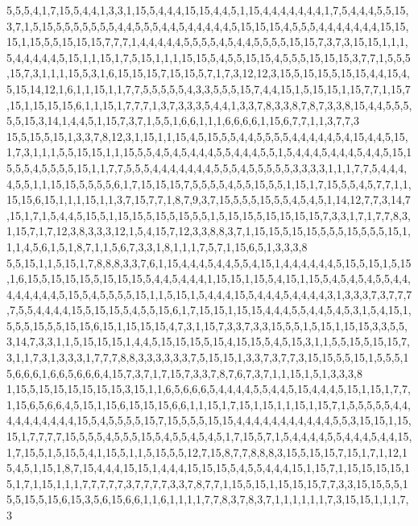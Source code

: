 5,5,5,4,1,7,15,5,4,4,1,3,3,1,15,5,4,4,4,15,15,4,4,5,1,15,4,4,4,4,4,4,4,1,7,5,4,4,4,5,5,15,3,7,1,5,15,5,5,5,5,5,5,5,4,4,5,5,5,4,4,5,4,4,4,4,4,5,15,15,15,4,5,5,5,4,4,4,4,4,4,4,15,15,15,1,15,5,5,15,15,15,7,7,7,1,4,4,4,4,4,5,5,5,5,4,5,4,4,5,5,5,5,15,15,7,3,7,3,15,15,1,1,1,5,4,4,4,4,4,5,15,1,1,15,1,7,5,15,1,1,1,15,15,5,4,5,5,15,15,4,5,5,5,15,15,15,3,7,7,1,5,5,5,15,7,3,1,1,1,15,5,3,1,6,15,15,15,7,15,15,5,7,1,7,3,12,12,3,15,5,15,15,5,15,15,4,4,15,4,5,15,14,12,1,6,1,1,15,1,1,7,7,5,5,5,5,5,4,3,3,5,5,5,15,7,4,4,15,1,5,15,15,1,15,7,7,1,15,7,15,1,15,15,15,6,1,1,15,1,7,7,7,1,3,7,3,3,3,5,4,4,1,3,3,7,8,3,3,8,7,8,7,3,3,8,15,4,4,5,5,5,5,5,15,3,14,1,4,4,5,1,15,7,3,7,1,5,5,1,6,6,1,1,1,6,6,6,6,1,15,6,7,7,1,1,3,7,7,3
15,5,15,5,15,1,3,3,7,8,12,3,1,15,1,1,15,4,5,15,5,5,4,4,5,5,5,5,4,4,4,4,4,5,4,15,4,4,5,15,1,7,3,1,1,1,5,5,15,15,1,1,15,5,5,4,5,4,5,4,4,4,5,5,4,4,4,5,5,1,5,4,4,4,5,4,4,4,5,4,4,5,15,15,5,5,4,5,5,5,5,15,1,1,7,7,5,5,5,4,4,4,4,4,4,4,5,5,5,4,5,5,5,5,5,3,3,3,3,1,1,1,7,7,5,4,4,4,4,5,5,1,1,15,15,5,5,5,5,6,1,7,15,15,15,7,5,5,5,5,4,5,5,15,5,5,1,15,1,7,15,5,5,4,5,7,7,1,1,15,15,6,15,1,1,1,15,1,1,3,7,15,7,7,1,8,7,9,3,7,15,5,5,5,15,5,5,4,5,4,5,1,14,12,7,7,3,14,7,15,1,7,1,5,4,4,5,15,5,1,15,15,5,15,5,15,5,5,1,5,15,15,5,15,15,15,15,7,3,3,1,7,1,7,7,8,3,1,15,7,1,7,12,3,8,3,3,3,12,1,5,4,15,7,12,3,3,8,8,3,7,1,15,15,5,15,15,5,5,5,15,5,5,5,15,1,1,1,4,5,6,1,5,1,8,7,1,1,5,6,7,3,3,1,8,1,1,1,7,5,7,1,15,6,5,1,3,3,3,8
5,5,15,1,1,5,15,1,7,8,8,8,3,3,7,6,1,15,4,4,4,5,4,4,5,5,4,15,1,4,4,4,4,4,4,5,15,5,15,1,5,15,1,6,15,5,15,15,15,5,15,15,15,5,4,4,5,4,4,4,1,15,15,1,15,5,4,15,1,15,5,4,5,4,5,4,5,5,4,4,4,4,4,4,4,4,5,15,5,4,5,5,5,5,15,1,1,5,15,1,5,4,4,4,15,5,4,4,4,5,4,4,4,4,3,1,3,3,3,7,3,7,7,7,7,5,5,4,4,4,4,15,5,15,15,5,4,5,5,15,6,1,7,15,15,1,15,15,4,4,4,5,5,4,4,5,4,5,3,1,5,4,15,1,5,5,5,15,5,5,15,15,6,15,1,15,15,15,4,7,3,1,15,7,3,3,7,3,3,15,5,5,1,5,15,1,15,15,3,3,5,5,3,14,7,3,3,1,1,5,15,15,15,1,4,4,5,15,15,15,5,15,4,15,15,5,4,5,15,3,1,1,5,5,15,5,15,15,7,3,1,1,7,3,1,3,3,3,1,7,7,7,8,8,3,3,3,3,3,3,7,5,15,15,1,3,3,7,3,7,7,3,15,15,5,5,15,1,5,5,5,15,6,6,6,1,6,6,5,6,6,6,4,15,7,3,7,1,7,15,7,3,3,7,8,7,6,7,3,7,1,1,15,1,5,1,3,3,3,8
1,15,5,15,15,15,15,15,15,3,15,1,1,6,5,6,6,6,5,4,4,4,4,5,5,4,4,5,15,4,4,4,5,15,1,15,1,7,7,1,15,6,5,6,6,4,5,15,1,15,6,15,15,15,6,6,1,1,15,1,7,15,1,15,1,1,15,1,15,7,1,5,5,5,5,5,4,4,4,4,4,4,4,4,4,4,15,5,4,5,5,5,5,15,7,15,5,5,5,15,15,4,4,4,4,4,4,4,4,4,4,4,5,5,3,15,15,1,15,15,1,7,7,7,7,15,5,5,5,4,5,5,5,15,5,4,5,5,4,5,4,5,1,7,15,5,7,1,5,4,4,4,4,5,5,4,4,4,5,4,4,15,1,7,15,5,1,5,15,5,4,1,15,5,1,1,5,15,5,5,12,7,15,8,7,7,8,8,8,3,15,5,15,15,7,15,1,7,1,12,15,4,5,1,15,1,8,7,15,4,4,4,15,15,1,4,4,4,15,15,15,5,4,5,5,4,4,4,15,1,15,7,1,15,15,15,15,15,1,7,1,15,1,1,1,7,7,7,7,7,3,7,7,7,7,3,3,7,8,7,7,1,15,5,15,1,15,15,15,7,7,3,3,15,15,5,5,15,5,15,5,15,6,15,3,5,6,15,6,6,1,1,6,1,1,1,1,7,7,8,3,7,8,3,7,1,1,1,1,1,1,7,3,15,15,1,1,1,7,3
